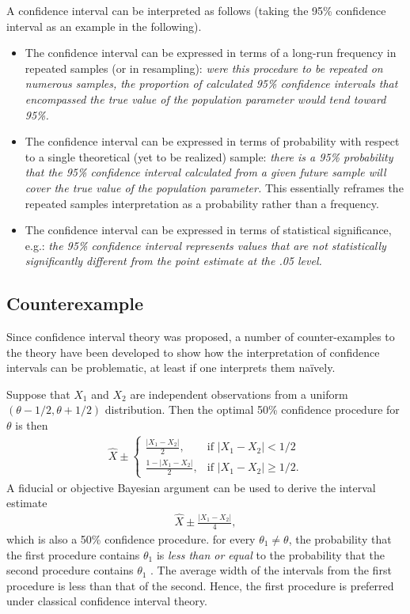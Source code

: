A confidence interval can be interpreted as follows (taking the 95\% confidence interval as an example in the following).
\begin{itemize}
\item The confidence interval can be expressed in terms of a long-run 
frequency in repeated samples (or in resampling): \emph{were this procedure to be repeated on numerous samples, 
the proportion of calculated 95\% confidence intervals that encompassed the true value of the population parameter would tend toward 95\%.}
\item The confidence interval can be expressed in terms of probability with respect to a single theoretical (yet to be realized) sample: \emph{there is a 95\% probability that the 95\% confidence interval calculated from a given future sample 
will cover the true value of the population parameter.}
This essentially reframes the repeated samples interpretation as a probability rather than a frequency.
\item The confidence interval can be expressed in terms of statistical significance, e.g.: \emph{the 95\% confidence 
interval represents values that are not statistically significantly different from the point estimate at the .05 level.}
\end{itemize}

\subsection{Counterexample}

Since confidence interval theory was proposed, 
a number of counter-examples to the theory have been developed to show how 
the interpretation of confidence intervals can be problematic, 
at least if one interprets them naïvely.

Suppose that \(X_{1}\) and \(X_{2}\) are independent observations from a uniform \((\theta - 1/2, \theta + 1/2)\) distribution. 
Then the optimal 50\% confidence procedure for \(\theta\) is then
\begin{align}
  \widehat{X}\pm
  \begin{cases}
    \frac{|X_1 - X_2|}{2}, & \text{if $|X_1 - X_2|< 1/2$}\\
    \frac{1 - |X_1 - X_2|}{2}, & \text{if $|X_1 - X_2| \geq 1/2$}.
  \end{cases}
\end{align}
A fiducial or objective Bayesian argument can be used to derive the interval estimate
\begin{align}
  \widehat{X}\pm \frac{|X_1 - X_2|}{4},
\end{align}
which is also a 50\% confidence procedure. 
for every \(\theta_1 \neq \theta\),
the probability that the first procedure contains \(\theta_1\) 
is \emph{less than or equal} to the probability that the second procedure contains \(\theta_1\) .
The average width of the intervals from the first procedure is less than that of the second. 
Hence, the first procedure is preferred under classical confidence interval theory.


